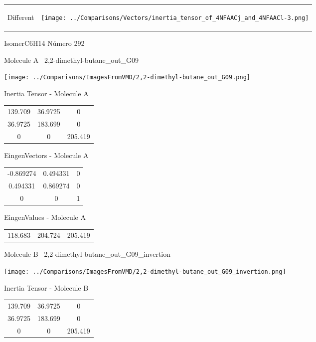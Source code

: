 \vtab[-5mm]
\begin{tabular}{*{2}{m{}}}
\begin{center}
\textcolor{NavyBlue}{\Large Different}
\end{center}
&
\begin{center}
\texttt{[image: ../Comparisons/Vectors/inertia\_tensor\_of\_4NFAACj\_and\_4NFAACl-3.png]}
\end{center}
\end{tabular}

 \newpage

\vtab[-3cm]
\begin{center}
{\large IsomerC6H14 \tab Número 292}
\end{center}
\begin{multicols}{2}
\begin{center}

Molecule A \
2,2-dimethyl-butane\_out\_G09

\texttt{[image: ../Comparisons/ImagesFromVMD/2,2-dimethyl-butane\_out\_G09.png]}

Inertia Tensor - Molecule A \\
\begin{tabular}{|c c c|}
139.709	 & 	36.9725	 & 	0	 \\
36.9725	 & 	183.699	 & 	0	 \\
0	 & 	0	 & 	205.419
\end{tabular}

\vtab
 EingenVectors - Molecule A     \\
\begin{tabular}{|c c c|}
-0.869274	 & 	0.494331	 & 	0	 \\
0.494331	 & 	0.869274	 & 	0	 \\
0	 & 	0	 & 	1
\end{tabular}

\vtab
 EingenValues - Molecule A     \\
\begin{tabular}{|c c c|}
118.683	 & 	204.724	 & 	205.419	 \\
\end{tabular}
\columnbreak

Molecule B \
2,2-dimethyl-butane\_out\_G09\_invertion

\texttt{[image: ../Comparisons/ImagesFromVMD/2,2-dimethyl-butane\_out\_G09\_invertion.png]}

Inertia Tensor - Molecule B \\
\begin{tabular}{|c c c|}
139.709	 & 	36.9725	 & 	0	 \\
36.9725	 & 	183.699	 & 	0	 \\
0	 & 	0	 & 	205.419
\end{tabular}


\end{center}
\end{multicols}
